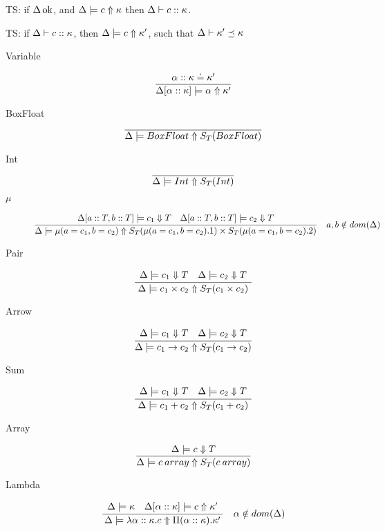 \documentclass[12pt,twoside,fleqn]{amsart}
\theoremstyle{plain}
\theoremstyle{plain}
\theoremstyle{definition}
\begin{document}
TS: if \( \Delta  \, \mathrm{ok} \), and \( \Delta  \models c \Uparrow \kappa  \)
then \( \Delta  \vdash c  ::\kappa   \).

TS: if \( \Delta  \vdash c  ::\kappa   \), then \( \Delta  \models c \Uparrow \kappa ' \),
such that \( \Delta  \vdash \kappa '  \preceq \kappa   \)

\begin{description}
\item [Variable]
\[
\frac{\alpha  ::\kappa  \doteq \kappa ' }{\Delta [\alpha ::\kappa ] \models \alpha  \Uparrow \kappa ' }\]

\item [BoxFloat]
\[
\overline{\Delta  \models BoxFloat \Uparrow S_{T}(BoxFloat ) }\]

\item [Int]
\[
\overline{\Delta  \models Int \Uparrow S_{T}(Int ) }\]

\item [\( \mu  \)]
\[
\frac{\begin{array}{ll}
\Delta [a::T,b::T] \models c_{1} \Downarrow T & \Delta [a::T,b::T] \models c_{2} \Downarrow T
\end{array} }{\Delta  \models \mu (a=c_{1},b=c_{2}) \Uparrow S_{T}(\mu (a=c_{1},b=c_{2}).1 )\times S_{T}(\mu (a=c_{1},b=c_{2}).2 ) }\quad a,b\notin dom(\Delta )\]
 
\item [Pair]
\[
\frac{\begin{array}{ll}
\Delta  \models c_{1} \Downarrow T & \Delta  \models c_{2} \Downarrow T
\end{array} }{\Delta  \models c_{1}\times c_{2} \Uparrow S_{T}(c_{1}\times c_{2} ) }\]

\item [Arrow]
\[
\frac{\begin{array}{ll}
\Delta  \models c_{1} \Downarrow T & \Delta  \models c_{2} \Downarrow T
\end{array} }{\Delta  \models c_{1}\rightarrow c_{2} \Uparrow S_{T}(c_{1}\rightarrow c_{2} ) }\]

\item [Sum]
\[
\frac{\begin{array}{ll}
\Delta  \models c_{1} \Downarrow T & \Delta  \models c_{2} \Downarrow T
\end{array} }{\Delta  \models c_{1}+c_{2} \Uparrow S_{T}(c_{1}+c_{2} ) }\]

\item [Array]
\[
\frac{\Delta  \models c \Downarrow T }{\Delta  \models c \: array \Uparrow S_{T}(c \: array ) }\]

\item [Lambda]
\[
\frac{\begin{array}{ll}
\Delta  \models \kappa  & \Delta [\alpha ::\kappa ] \models c \Uparrow \kappa '
\end{array} }{\Delta  \models \lambda \alpha  ::\kappa  .c \Uparrow \Pi (\alpha ::\kappa ).\kappa ' }\quad \alpha \notin dom(\Delta )\]


\end{description}
\end{document}
